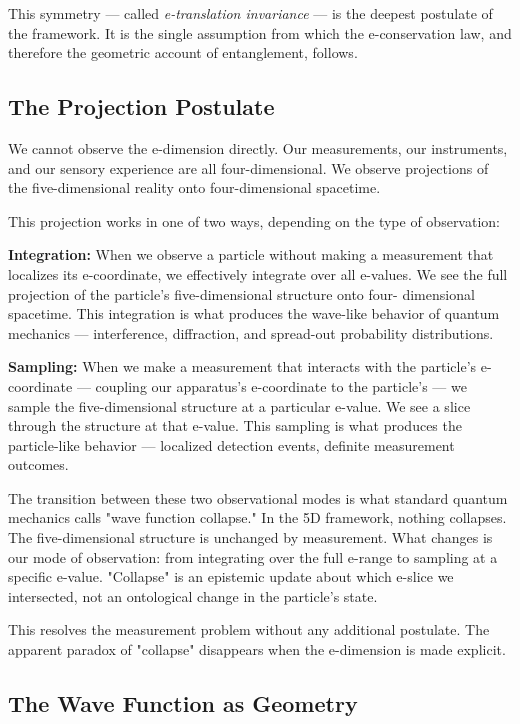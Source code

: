 \documentclass[aps,prd,preprint,superscriptaddress,longbibliography,floatfix]{revtex4-2}
\theoremstyle{remark}
\begin{document}
This symmetry --- called \textit{e-translation invariance} --- is the deepest postulate of the framework. It is the single assumption from which the e-conservation law, and therefore the geometric account of entanglement, follows.



\subsection{The Projection Postulate}

We cannot observe the e-dimension directly. Our measurements, our instruments, and our sensory experience are all four-dimensional. We observe projections of the five-dimensional reality onto four-dimensional spacetime.

This projection works in one of two ways, depending on the type of observation:

\textbf{Integration:} When we observe a particle without making a measurement that localizes its e-coordinate, we effectively integrate over all e-values. We see the full projection of the particle's five-dimensional structure onto four- dimensional spacetime. This integration is what produces the wave-like behavior of quantum mechanics --- interference, diffraction, and spread-out probability distributions.

\textbf{Sampling:} When we make a measurement that interacts with the particle's e-coordinate --- coupling our apparatus's e-coordinate to the particle's --- we sample the five-dimensional structure at a particular e-value. We see a slice through the structure at that e-value. This sampling is what produces the particle-like behavior --- localized detection events, definite measurement outcomes.

The transition between these two observational modes is what standard quantum mechanics calls "wave function collapse." In the 5D framework, nothing collapses. The five-dimensional structure is unchanged by measurement. What changes is our mode of observation: from integrating over the full e-range to sampling at a specific e-value. "Collapse" is an epistemic update about which e-slice we intersected, not an ontological change in the particle's state.

This resolves the measurement problem without any additional postulate. The apparent paradox of "collapse" disappears when the e-dimension is made explicit.



\subsection{The Wave Function as Geometry}
\end{document}
